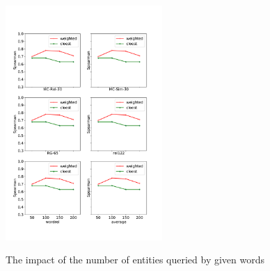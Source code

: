 \begin{figure}[]
    \centering
    \includegraphics[width=0.53\textwidth]{pic/dim.pdf}\\
    \caption{The impact of the number of entities queried by given words}
    \label{ent-num} 
\end{figure}


